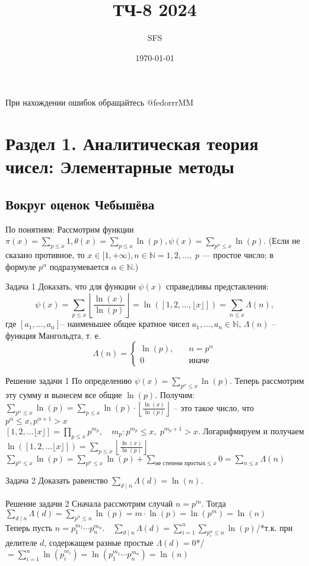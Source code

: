 \documentclass[a4paper,12pt]{article}
\title{ТЧ-8 2024}
\author{SFS}
\date{\today}
\newcommand{\TE}{\theta}
\newcommand{\AL}{\alpha}
\newcommand{\SI}{\psi}
\newcommand{\q}{\quad}
\newcommand{\bb}[1]{\mathbb{#1}}
\newcommand{\SL}{\sum\limits}
\begin{document}
\maketitle
При нахождении ошибок обращайтесь @fedorrrMM\\


\tableofcontents
\newpage
\section{Раздел 1. Аналитическая теория чисел: Элементарные методы}
\begin{mybox}{}
\subsection{Вокруг оценок Чебышёва}
По понятиям: Рассмотрим функции $\pi(x) = \SL_{p\le x} 1, \TE(x) = \SL_{p\le x}\ln(p), \SI(x) = \SL_{p^\AL\le x}\ln(p).$ (Если не сказано
противное, то $x \in [1, +\infty), n \in \bb{N} = {1, 2, …}, \;p$ — простое число; в формуле $p^\AL$ подразумевается $\AL \in \bb{N}$.)
\begin{task}{Задача 1}
Доказать, что для функции $\SI(x)$ справедливы представления:
\[\SI(x) = \SL_{p\le x} \left\lfloor \frac{\ln(x)}{\ln(p)}  \right\rfloor = \ln([1, 2,\dots, \lfloor x\rfloor]) = \SL_{n \le x}\Lambda(n),\] $\text{где }[a_1,\dots, a_n]$-- наименьшее общее кратное чисел $a_1,\dots, a_n \in \bb{N}$,  $\Lambda(n)$ -- функция Мангольдта, т. е.
\[\Lambda(n) = \begin{cases} \ln(p),\q &n = p^{\AL}\\0\q&\text{иначе} \end{cases}\]
\end{task}
\begin{sol}{Решение задачи 1}
По определению $\SI(x) = \SL_{p^\AL\le x}\ln(p).$ Теперь рассмотрим эту сумму и вынесем все общие $\ln(p)$. Получим: $\SL_{p^\AL \le x}\ln(p) = \SL_{p\le x}\ln(p) \cdot \left\lfloor \frac{\ln(x)}{\ln(p)}  \right\rfloor$ -- это такое число, что $p^\AL \le x, p^{\AL+1}>x$\\
$[1,2,\dots\lfloor x\rfloor] = \prod_{p\le x}p^{m_p},\q m_p: p^{m_p} \le x,\; p^{m_p + 1} > x.$ Логарифмируем и получаем $\ln([1,2,\dots\lfloor x\rfloor]) = \SL_{p\le x} \left\lfloor \frac{\ln(x)}{\ln(p)}  \right\rfloor$\\
$\SL_{p^\AL\le x}\ln(p) = \SL_{p^\AL\le x}\ln(p) + \SL_{\text{не степени простых} \le x} 0 = \SL_{n \le x}\Lambda(n)$
\end{sol}

\begin{task}{Задача 2}
Доказать равенство $\SL_{d\mid n}\Lambda(d) = \ln(n).$
\end{task}
\begin{sol}{Решение задачи 2}
Сначала рассмотрим случай $n = p^m$. Тогда $\SL_{d\mid n}\Lambda(d) = \SL_{p^\AL \le n}\ln(p) = m\cdot \ln(p) = \ln(p^m) = \ln(n) $\\
Теперь пусть $n = p_1^{m_1}\cdots p_n^{m_n}. \q \SL_{d\mid n}\Lambda(d) = \SL_{i = 1}^n \SL_{p_i^\AL\le n} \ln(p) ${/*т.к. при делителе $d$, содержащем разные простые $\Lambda(d) = 0$*/}$ = \SL_{i = 1}^n \ln(p_i^{m_i}) = \ln(p_1^{m_1}\cdots p_n^{m_n}) = \ln(n)$ 
\end{sol}


\end{mybox}
\end{document}
